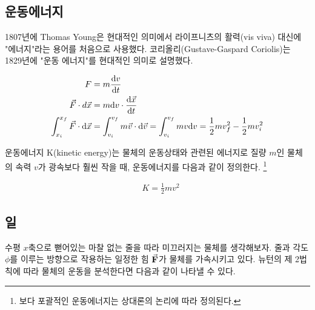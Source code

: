 \begin{flushleft}
\subsection{운동에너지}
1807년에 Thomas Young은 현대적인 의미에서 라이프니츠의 활력(vis viva) 대신에 \\"에너지"라는 용어를 처음으로 사용했다.
코리올리(Gustave-Gaspard Coriolis)는 1829년에 "운동 에너지"를 현대적인 의미로 설명했다.  

\[
  \begin{split}
  F &= m \dv{v}{t}\\
  \vec{F}\cdot d \vec{x} &= m \textrm{d}v \cdot \dv{\vec{x}}{t}\\
  \int_{x_i}^{x_f} \vec{F} \cdot \textrm{d} \vec{x} &= 
  \int_{v_i}^{v_f}m\vec{v} \cdot \textrm{d}\vec{v} = \int_{v_i}^{v_f}mv \textrm{d}v
  =\frac{1}{2}mv_f^2-\frac{1}{2}mv_i^2
  \end{split}
\]

운동에너지 K(kinetic energy)는 물체의 운동상태와 관련된 에너지로 질량 $m$인 물체의 속력 $v$가 광속보다 훨씬 작을 때,
운동에너지를 다음과 같이 정의한다. \footnote{보다 포괄적인 운동에너지는 상대론의 논리에 따라 정의된다.}




\begin{defn}[운동에너지]
  \begin{align}
 &K=\frac{1}{2}mv^2
\end{align}
\end{defn}




\subsection{일}
수평 $x$축으로 뻗어있는 마찰 없는 줄을 따라 미끄러지는 물체를 생각해보자. 줄과 각도 $\phi$를 이루는 방향으로 작용하는 일정한 
힘 $\va{F}$가 물체를 가속시키고 있다. 뉴턴의 제 2법칙에 따라 물체의 운동을 분석한다면 다음과 같이 나타낼 수 있다. 


\end{flushleft}
